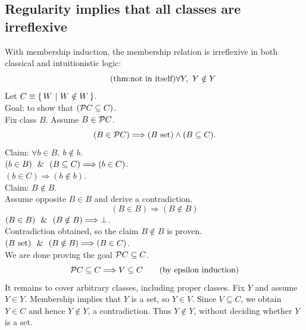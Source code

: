\subsection{Regularity implies that all classes are irreflexive}
\begin{theorem}
With membership induction, the membership relation is irreflexive in both
classical and intuitionistic logic:
\[
\labeltagd{thm}{not in itself}
\forall Y,\ Y\notin Y
\]
\Proof
Let $C\equiv \left\{\,W\ \middle|\ W\notin W\,\right\}$.\\
Goal: to show that $(\mathcal{P} C\subseteq C)$.\\
Fix class $B$. Assume $B\in \mathcal{P} C$.
\[
(B\in \mathcal{P} C) \Longrightarrow (B\mathrm{\ set})\land(B\subseteq C).
\]
Claim: $\forall b\in B,\ b\notin b$.\\ %
$(b\in B)\ \ \&\ \ (B\subseteq C) \Longrightarrow (b\in C)$.\\
$(b\in C) \Longrightarrow (b\notin b)$.\\
Claim: $B\notin B$.\\
Assume opposite $B\in B$ and derive a contradiction.
\[
(B\in B) \Longrightarrow (B\notin B)
 \tag{by previous claim}
\]
$(B\in B)\ \ \&\ \ (B\notin B) \Longrightarrow \bot$.\\
Contradiction obtained, so the claim  $B\notin B$ is proven.\\
$(B\mathrm{\ set})\ \ \&\ \ (B\notin B) \Longrightarrow (B\in C)$.\\
We are done proving the goal $\mathcal{P} C\subseteq C$.
\[
\mathcal{P} C\subseteq C \Longrightarrow V\subseteq C
\tag{by epsilon induction}
\]
It remains to cover arbitrary classes, including proper classes. Fix $Y$
and assume $Y\in Y$. Membership implies that $Y$ is a set, so $Y\in V$.
Since $V\subseteq C$, we obtain $Y\in C$ and hence $Y\notin Y$, a
contradiction. Thus $Y\notin Y$, without deciding whether $Y$ is a set.
\Done
\end{theorem}
